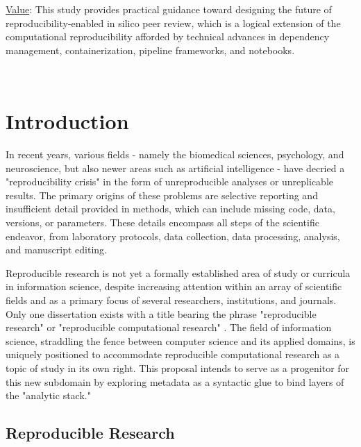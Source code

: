 \documentclass{drexelthesis}
\begin{document}
\uline{Value}: This study provides practical guidance toward designing the future of reproducibility-enabled in silico peer review, which is a logical extension of the computational reproducibility afforded by technical advances in dependency management, containerization, pipeline frameworks, and notebooks.

\newpage 

\ %

\newpage

\section{Introduction}

In recent years, various fields - namely the biomedical sciences, psychology, and neuroscience, but also newer areas such as artificial intelligence - have decried a "reproducibility crisis" \cite{Baker2016-ri} in the form of unreproducible analyses or unreplicable results. The primary origins of these problems are selective reporting and insufficient detail provided in methods, which can include missing code, data, versions, or parameters. These details encompass all steps of the scientific endeavor, from laboratory protocols, data collection, data processing, analysis, and manuscript editing.

Reproducible research is not yet a formally established area of study or curricula in information science, despite increasing attention within an array of scientific fields and as a primary focus of several researchers, institutions, and journals. Only one dissertation exists with a title bearing the phrase "reproducible research" or "reproducible computational research" \cite{Pham2014-ad}. The field of information science, straddling the fence between computer science and its applied domains, is uniquely positioned to accommodate reproducible computational research as a topic of study in its own right. This proposal intends to serve as a progenitor for this new subdomain by exploring metadata as a syntactic glue to bind layers of the "analytic stack."

\subsection{Reproducible Research}
\end{document}
